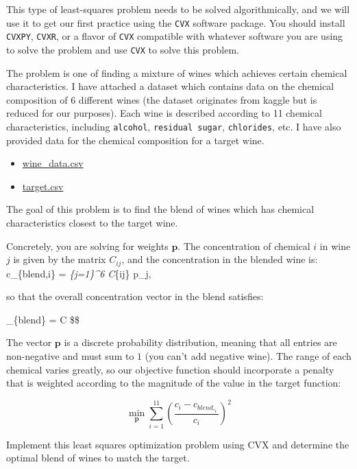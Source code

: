 \documentclass[
  letterpaper,
  DIV=11,
  numbers=noendperiod]{scrartcl}
\providecommand{\tightlist}{%
  \setlength{\itemsep}{0pt}\setlength{\parskip}{0pt}}\usepackage{longtable,booktabs,array}
\begin{document}
This type of least-squares problem needs to be solved algorithmically,
and we will use it to get our first practice using the \texttt{CVX}
software package. You should install \texttt{CVXPY}, \texttt{CVXR}, or a
flavor of \texttt{CVX} compatible with whatever software you are using
to solve the problem and use \texttt{CVX} to solve this problem.

The problem is one of finding a mixture of wines which achieves certain
chemical characteristics. I have attached a dataset which contains data
on the chemical composition of 6 different wines (the dataset originates
from kaggle but is reduced for our purposes). Each wine is described
according to 11 chemical characteristics, including \texttt{alcohol},
\texttt{residual\ sugar}, \texttt{chlorides}, etc. I have also provided
data for the chemical composition for a target wine.

\begin{itemize}
\tightlist
\item
  \href{https://github.com/georgehagstrom/DATA609Spring2025/blob/main/website/assignments/labs/labData/wine_data.csv}{wine\_data.csv}
\item
  \href{https://github.com/georgehagstrom/DATA609Spring2025/blob/main/website/assignments/labs/labData/target.csv}{target.csv}
\end{itemize}

The goal of this problem is to find the blend of wines which has
chemical characteristics closest to the target wine.

Concretely, you are solving for weights \(\mathbf{p}\). The
concentration of chemical \(i\) in wine \(j\) is given by the matrix
\(C_{ij}\), and the concentration in the blended wine is: c\_\{blend,i\}
= \sum\emph{\{j=1\}\^{}6 C}\{ij\} p\_j,

so that the overall concentration vector in the blend satisfies:

\_\{blend\} = C \$\$

The vector \(\mathbf{p}\) is a discrete probability distribution,
meaning that all entries are non-negative and must sum to \(1\) (you
can't add negative wine). The range of each chemical varies greatly, so
our objective function should incorporate a penalty that is weighted
according to the magnitude of the value in the target function:

\[
\min_{\mathbf{p}} \sum_{i=1}^{11} \left(\frac{c_i-c_{blend,_i}}{c_i}\right)^2
\]

Implement this least squares optimization problem using CVX and
determine the optimal blend of wines to match the target.
\end{document}
